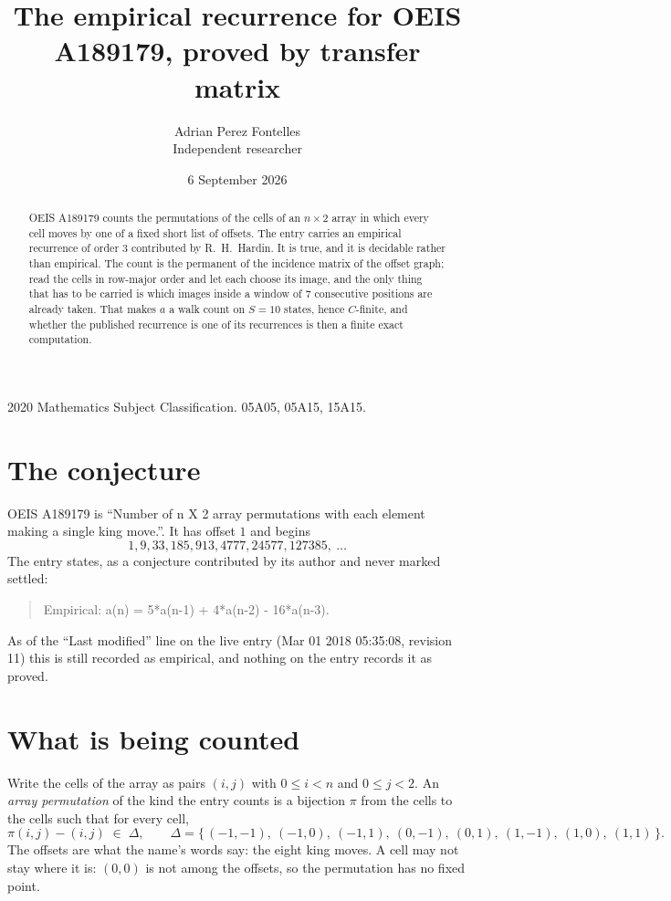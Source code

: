 \documentclass[11pt,a4paper]{article}
\title{The empirical recurrence for OEIS A189179, proved by transfer matrix}
\author{Adrian Perez Fontelles\\ \small Independent researcher}
\date{6 September 2026}
\theoremstyle{plain}
\theoremstyle{definition}
\begin{document}
\maketitle

\begin{abstract}
OEIS A189179 counts the permutations of the cells of an $n\times2$ array in which every cell
moves by one of a fixed short list of offsets. The entry carries an empirical recurrence of
order $3$ contributed by R.~H.~Hardin. It is true, and it is decidable rather than
empirical. The count is the permanent of the incidence matrix of the offset graph; read the
cells in row-major order and let each choose its image, and the only thing that has to be
carried is which images inside a window of $7$ consecutive positions are already taken.
That makes $a$ a walk count on $S=10$ states, hence $C$-finite, and whether the published
recurrence is one of its recurrences is then a finite exact computation.
\end{abstract}

\noindent\small 2020 Mathematics Subject Classification. 05A05, 05A15, 15A15.\normalsize

\section{The conjecture}

OEIS A189179 is ``Number of n X 2 array permutations with each element making a single king move.''. It has offset $1$ and begins
\[
1, 9, 33, 185, 913, 4777, 24577, 127385,\ \dots
\]
The entry states, as a conjecture contributed by its author and never marked settled:
\begin{quote}
Empirical: a(n) = 5*a(n-1) + 4*a(n-2) - 16*a(n-3).
\end{quote}
As of the ``Last modified'' line on the live entry (Mar 01 2018 05:35:08, revision 11) this is still
recorded as empirical, and nothing on the entry records it as proved.

\section{What is being counted}

Write the cells of the array as pairs $(i,j)$ with $0\le i<n$ and $0\le j<2$. An
\emph{array permutation} of the kind the entry counts is a bijection $\pi$ from the cells to
the cells such that for every cell,
\[
\pi(i,j)-(i,j)\;\in\;\Delta,\qquad
\Delta=\{\,(-1,-1),\ (-1,0),\ (-1,1),\ (0,-1),\ (0,1),\ (1,-1),\ (1,0),\ (1,1)\,\}.
\]
The offsets are what the name's words say: the eight king moves. A cell may not stay where it is: $(0,0)$ is not among the offsets, so the permutation has no fixed point.
\end{document}
